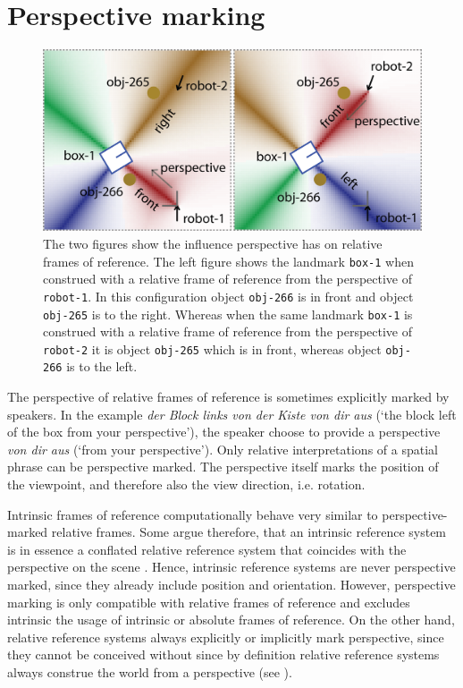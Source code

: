 \section{Perspective marking}

\begin{figure}
\begin{center}
\includegraphics[width=0.7\columnwidth]{figs/space-scene-3-influence-perspective.png}
\caption[Influence of perspective on relative frames of reference.]
{The two figures show the influence perspective has on relative frames of reference.
The left figure shows the landmark {\footnotesize\tt box-1} when construed with a relative frame of reference
from the perspective of {\footnotesize\tt robot-1}. 
In this configuration object {\footnotesize\tt obj-266} is in front and object {\footnotesize\tt obj-265} is to the right.
Whereas when the same landmark {\footnotesize\tt box-1} is construed with a relative frame of reference
from the perspective of {\footnotesize\tt robot-2} it is object {\footnotesize\tt obj-265} which is in front,
whereas object {\footnotesize\tt obj-266} is to the left.}
\label{f:influence-perspective}
\end{center}
\end{figure}

The perspective of relative frames of reference is sometimes explicitly marked
by speakers. In the example \textit{der Block links von der Kiste von dir aus} (`the block left of the box from your perspective'),
the speaker choose to provide a perspective \textit{von dir aus} (`from your
perspective'). Only relative interpretations of a spatial phrase can be perspective 
marked. The perspective itself marks the position of the viewpoint, and therefore 
also the view direction, i.e. rotation. 

Intrinsic frames of reference computationally behave very similar to perspec\-tive-marked 
relative frames. Some argue therefore, that an intrinsic reference system is in essence a 
conflated relative reference system that coincides with the perspective 
on the scene \citep{levinson1996language}. 
Hence, intrinsic reference systems are never perspective marked, since they already 
include position and orientation. However, perspective marking is only compatible with relative 
frames of reference and excludes intrinsic the usage
of intrinsic or absolute frames of reference. 
On the other hand, relative reference systems always explicitly or implicitly mark 
perspective, since they cannot be conceived without since by definition relative 
reference systems always construe the world from a perspective (see
).


